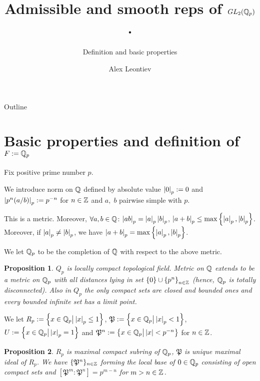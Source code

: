 \documentclass[pdf,notes]{beamer}
\title{Admissible and smooth reps of $GL_2(\mathbb{Q}_p)$.}
\subtitle{Definition and basic properties}
\author{Alex Leontiev}
\theoremstyle{mystyle}
\newtheorem{prop}{Proposition}
\begin{document}
\begin{frame}\titlepage\end{frame}
\begin{frame}{Outline}
			\tableofcontents
\end{frame}
\section{Basic properties and definition of $F:=\mathbb{Q}_p$}
\begin{frame}
	Fix positive prime number $p$.
	\begin{definition}
		We introduce norm on $\mathbb{Q}$ defined by absolute value
		$\left|0\right|_p:=0$ and $\left|p^n(a/b)\right|_p:=p^{-n}$
		for $n\in\mathbb{Z}$ and $a,\;b$ pairwise simple with $p$.
	\end{definition}
		This is a metric. Moreover, $\forall a,b\in\mathbb{Q}$:
		$\left|ab\right|_p=\left|a\right|_p\left|b\right|_p$, $\myabs{a+b}_p\le\max\left\{ \myabs{a}_p,\myabs{b}_p \right\}$.
		Moreover, if $\left|a\right|_p\neq\left|b\right|_p$, we have $\myabs{a+b}_p=\max\left\{ \myabs{a}_p,\myabs{b}_p \right\}$.
\end{frame}
\begin{frame}
	\begin{definition}
		We let $\mathbb{Q}_p$ to be the completion of $\mathbb{Q}$ with respect to the above metric.
	\end{definition}
	\begin{prop}
		$Q_p$ is locally compact topological field. Metric on $\mathbb{Q}$ extends to be a metric on $\mathbb{Q}_p$ with all distances
		lying in set $\left\{ 0 \right\}\cup\left\{ p^n \right\}_{n\in\mathbb{Z}}$ (hence, $\mathbb{Q}_p$ is totally disconnected). Also in
		$Q_p$ the only compact sets are closed and bounded ones and every bounded infinite set has a limit point.
	\end{prop}
\end{frame}
\begin{frame}
	\begin{definition}
		We let $R_p:=\left\{x\in\mathbb{Q}_p\big| \left|x\right|_p\le1\right\}$, $\mathfrak{P}:=\left\{x\in\mathbb{Q}_p\big| \left|x\right|_p<1\right\}$,
		$U:=\left\{x\in\mathbb{Q}_p\big| \left|x\right|_p=1\right\}$ and $\mathfrak{P}^n:=\left\{x\in\mathbb{Q}_p\big| \left|x\right|<p^{-n}\right\}$ for $n\in\mathbb{Z}$.
	\end{definition}
	\begin{prop}
		$R_p$ is maximal compact subring of $\mathbb{Q}_p$, $\mathfrak{P}$ is unique maximal ideal of $R_p$. We have $\{
			\mathfrak{P}^n\}_{n\in\mathbb{Z}}$
			forming the local base of $0\in\mathbb{Q}_p$ consisting of open compact sets and $\left[ \mathfrak{P}^m:\mathfrak{P}^n
			\right]=p^{m-n}$ for $m>n\in\mathbb{Z}$.
	\end{prop}
\end{frame}
\end{document}
